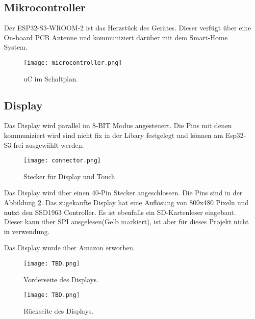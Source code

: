         \subsection{Mikrocontroller}
        Der ESP32-S3-WROOM-2 ist das Herzstück des Gerätes. Dieser verfügt über eine On-board PCB Antenne
        und kommuniziert darüber mit dem Smart-Home System. 

            \begin{figure}[h!]
                \centering
                \texttt{[image: microcontroller.png]}
                \caption{uC im Schaltplan.}
                \label{fig:sch3}

            \end{figure}

        \newpage
        \subsection{Display}
        Das Display wird parallel im 8-BIT Modus angesteuert. Die Pins mit denen 
        kommuniziert wird sind nicht fix in der Libary festgelegt und können am Esp32-S3 
        frei ausgewählt werden. 

            \begin{figure}[h!]
                \centering
                \texttt{[image: connector.png]}
                \caption{Stecker für Display und Touch}
                \label{fig:sch4}

            \end{figure}

        Das Display wird über einen 40-Pin Stecker angeschlossen. Die Pins sind in der Abbildung \ref{fig:sch4}.
        Das zugekaufte Display hat eine Auflösung von 800x480 Pixeln und nutzt den SSD1963 Controller.
        Es ist ebenfalls ein SD-Kartenleser eingebaut. Dieser kann über SPI ausgelesen(Gelb markiert), ist 
        aber für dieses Projekt nicht in verwendung. 

        \newpage
        Das Display wurde über Amazon erworben.

            \begin{figure}[h!]
                \centering
                \texttt{[image: TBD.png]}
                \caption{Vorderseite des Displays.}
                \label{fig:displayfront}
            
            \end{figure}

            \begin{figure}[h!]
                \centering
                \texttt{[image: TBD.png]}
                \caption{Rückseite des Displays.}
                \label{fig:displayback}
            
            \end{figure}

